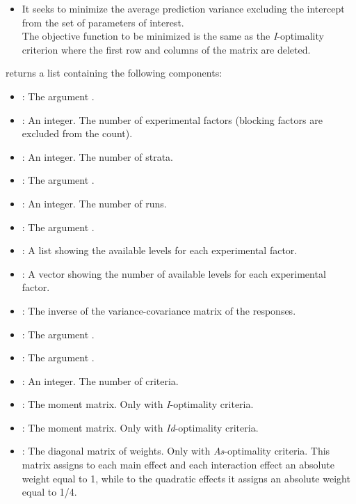 \documentclass[a4paper]{book}
\begin{document}
\begin{Details}
\begin{itemize}
\item{}   It seeks to minimize the average
prediction variance excluding the intercept from the set of parameters of
interest. \\{}
The objective function to be minimized is the same as the
\emph{I}-optimality criterion where the first row and columns of the 
matrix are deleted.

\end{itemize}

\end{Details}
%
\begin{Value}
 returns a list containing the following components:
\begin{itemize}

\item{} : The argument .
\item{} : An integer. The number of experimental factors (blocking factors are excluded from the count).
\item{} : An integer. The number of strata.
\item{} : The argument .
\item{} : An integer. The number of runs.
\item{} : The argument .
\item{} : A list showing the available levels for each experimental factor.
\item{} : A vector showing the number of available levels for each experimental factor.
\item{} : The inverse of the variance-covariance matrix of the responses.
\item{} : The argument .
\item{} : The argument .
\item{} : An integer. The number of criteria.
\item{} : The moment matrix. Only with \emph{I}-optimality criteria.
\item{} : The moment matrix. Only with \emph{Id}-optimality criteria.
\item{} : The diagonal matrix of weights. Only with \emph{As}-optimality criteria.
This matrix assigns to each main effect and each interaction effect an absolute
weight equal to 1, while to the quadratic effects it assigns an absolute weight
equal to 1/4.

\end{itemize}

\end{Value}
\end{document}
